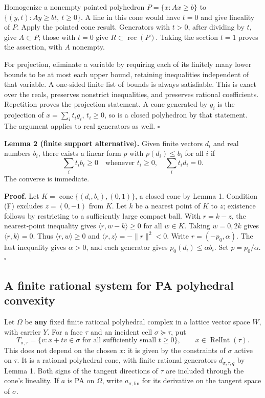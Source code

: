 \documentclass[
  11pt,
]{article}
\begin{document}
Homogenize a nonempty pointed polyhedron \(P=\{x:Ax\geq b\}\) to
\(\{(y,t):Ay\geq bt,\ t\geq0\}\). A line in this cone would have \(t=0\)
and give lineality of \(P\). Apply the pointed cone result. Generators
with \(t>0\), after dividing by \(t\), give \(A\subset P\); those with
\(t=0\) give \(R\subset\operatorname{rec}(P)\). Taking the section
\(t=1\) proves the assertion, with \(A\) nonempty.

For projection, eliminate a variable by requiring each of its finitely
many lower bounds to be at most each upper bound, retaining inequalities
independent of that variable. A one-sided finite list of bounds is
always satisfiable. This is exact over the reals, preserves nonstrict
inequalities, and preserves rational coefficients. Repetition proves the
projection statement. A cone generated by \(g_i\) is the projection of
\(x=\sum_i t_ig_i\), \(t_i\geq0\), so is a closed polyhedron by that
statement. The argument applies to real generators as well. \(\square\)

\textbf{Lemma 2 (finite support alternative).} Given finite vectors
\(d_i\) and real numbers \(b_i\), there exists a linear form \(p\) with
\(p(d_i)\leq b_i\) for all \(i\) if \[
\sum_i t_ib_i\geq0\quad\text{whenever }t_i\geq0,
\quad\sum_i t_id_i=0.
\tag{F}
\] The converse is immediate.

\textbf{Proof.} Let \(K=\operatorname{cone}\{(d_i,b_i),(0,1)\}\), a
closed cone by Lemma 1. Condition (F) excludes \(z=(0,-1)\) from \(K\).
Let \(k\) be a nearest point of \(K\) to \(z\); existence follows by
restricting to a sufficiently large compact ball. With \(r=k-z\), the
nearest-point inequality gives \(\langle r,w-k\rangle\geq0\) for all
\(w\in K\). Taking \(w=0,2k\) gives \(\langle r,k\rangle=0\). Thus
\(\langle r,w\rangle\geq0\) and \(\langle r,z\rangle=-\|r\|^2<0\). Write
\(r=(-p_0,\alpha)\). The last inequality gives \(\alpha>0\), and each
generator gives \(p_0(d_i)\leq\alpha b_i\). Set \(p=p_0/\alpha\).
\(\square\)

\subsection{A finite rational system for PA polyhedral
convexity}\label{a-finite-rational-system-for-pa-polyhedral-convexity}

Let \(\Omega\) be \textbf{any} fixed finite rational polyhedral complex
in a lattice vector space \(W\), with carrier \(Y\). For a face \(\tau\)
and an incident cell \(\sigma\succeq\tau\), put \[
T_{\sigma,\tau}=\{v:x+tv\in\sigma\text{ for all sufficiently small }t\geq0\},
\qquad x\in\operatorname{RelInt}(\tau).
\] This does not depend on the chosen \(x\): it is given by the
constraints of \(\sigma\) active on \(\tau\). It is a rational
polyhedral cone, with finite rational generators \(d_{\sigma,\tau,q}\)
by Lemma 1. Both signs of the tangent directions of \(\tau\) are
included through the cone's lineality. If \(a\) is PA on \(\Omega\),
write \(a_{\sigma,\mathrm{lin}}\) for its derivative on the tangent
space of \(\sigma\).
\end{document}
